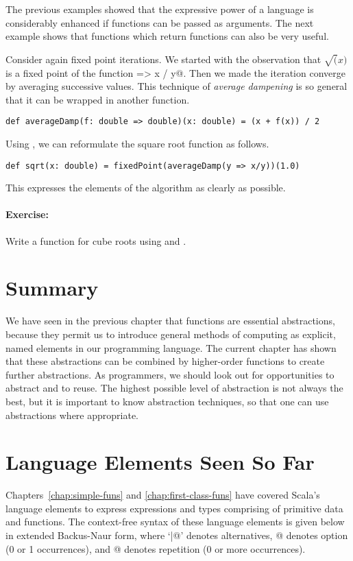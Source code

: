 \documentclass[11pt]{book}
\newcommand{\exercise}{\paragraph{Exercise:}}
\begin{document}
The previous examples showed that the expressive power of a language
is considerably enhanced if functions can be passed as arguments.  The
next example shows that functions which return functions can also be
very useful.

Consider again fixed point iterations. We started with the observation
that $\sqrt(x)$ is a fixed point of the function \verb@y => x / y@.
Then we made the iteration converge by averaging successive values.
This technique of {\em average dampening} is so general that it
can be wrapped in another function.
\begin{verbatim}
def averageDamp(f: double => double)(x: double) = (x + f(x)) / 2
\end{verbatim}
Using \verb@averageDamp@, we can reformulate the square root function
as follows.
\begin{verbatim}
def sqrt(x: double) = fixedPoint(averageDamp(y => x/y))(1.0)
\end{verbatim}
This expresses the elements of the algorithm as clearly as possible.

\exercise Write a function for cube roots using \verb@fixedPoint@ and 
\verb@averageDamp@.

\section{Summary}

We have seen in the previous chapter that functions are essential
abstractions, because they permit us to introduce general methods of
computing as explicit, named elements in our programming language.
The current chapter has shown that these abstractions can be combined by
higher-order functions to create further abstractions.  As
programmers, we should look out for opportunities to abstract and to
reuse. The highest possible level of abstraction is not always the
best, but it is important to know abstraction techniques, so that one
can use abstractions where appropriate.

\section{Language Elements Seen So Far}

Chapters~\ref{chap:simple-funs} and \ref{chap:first-class-funs} have
covered Scala's language elements to express expressions and types
comprising of primitive data and functions.  The context-free syntax
of these language elements is given below in extended Backus-Naur
form, where `\verb@|@' denotes alternatives, \verb@[...]@ denotes
option (0 or 1 occurrences), and @ denotes repetition (0 or
more occurrences).
\end{document}
